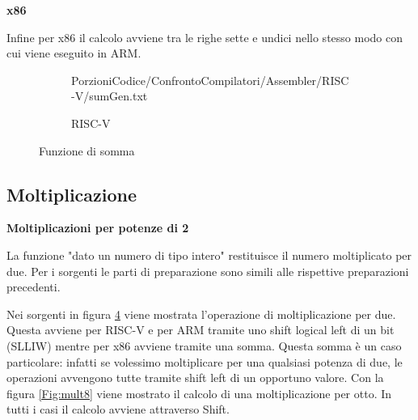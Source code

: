 \documentclass[12pt, a4paper]{report}
\begin{document}
\vspace{0.3 cm}
\textbf{x86}

Infine per x86 il calcolo avviene tra le righe sette e undici nello stesso modo con cui viene eseguito in ARM.

\begin{figure}[ht]
 
 \begin{subfigure}[b]{0.3\textwidth}
 
  {PorzioniCodice/ConfrontoCompilatori/Assembler/RISC-V/sumGen.txt}
	\label{Code:Add2RISC}
\caption{RISC-V}
 \end{subfigure}
 \hfill
 \begin{subfigure}[b]{0.3\textwidth}
 
 
 \label{Code:Add2ARM}

 \end{subfigure}
 \hfill
 \begin{subfigure}[b]{0.3\textwidth}
 
 
	 
	\label{Code:Add2X86}
 \end{subfigure}
 
 \caption{Funzione di somma}
 \label{Fig:code2}
\end{figure}



\subsection{Moltiplicazione}

\vspace{0.3 cm}
\textbf{Moltiplicazioni per potenze di 2}



La funzione "dato un numero di tipo intero" restituisce il numero moltiplicato per due. Per i sorgenti le parti di preparazione sono simili alle rispettive preparazioni precedenti.


\vspace{0.3 cm}
Nei sorgenti in figura \ref{Fig:code2} viene mostrata l'operazione di moltiplicazione per due. Questa avviene per RISC-V e per ARM tramite uno shift logical left di un bit (SLLIW) mentre per x86 avviene tramite una somma. Questa somma è un caso particolare: infatti se volessimo moltiplicare per una qualsiasi potenza di due,  le operazioni avvengono tutte tramite shift left di un opportuno valore. Con la figura \ref{Fig:mult8} viene mostrato il calcolo di una moltiplicazione per otto. In tutti i casi il calcolo avviene attraverso Shift.
\end{document}
